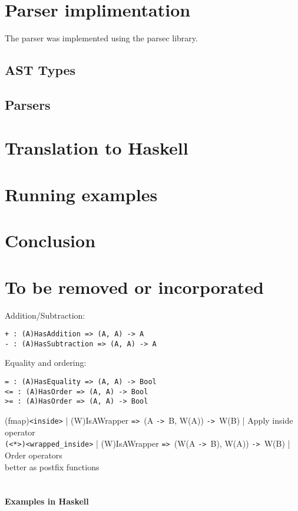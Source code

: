 \documentclass{article}
\def\H{Haskell}
\def\ra{\texttt{->}\ }
\def\Ra{\texttt{=>}\ }
\begin{document}
\section{Parser implimentation}

The parser was implemented using the parsec library.

\subsection{AST Types}

\subsection{Parsers}

\section{Translation to \H}
\section{Running examples}
\section{Conclusion}

\section{To be removed or incorporated}

Addition/Subtraction:
\begin{verbatim}
+ : (A)HasAddition => (A, A) -> A
- : (A)HasSubtraction => (A, A) -> A
\end{verbatim}
Equality and ordering:
\begin{verbatim}
= : (A)HasEquality => (A, A) -> Bool
<= : (A)HasOrder => (A, A) -> Bool
>= : (A)HasOrder => (A, A) -> Bool
\end{verbatim}

(fmap)\texttt{<inside>} | (W)IsAWrapper \Ra (A \ra B, W(A)) \ra W(B) | Apply inside operator \\
\texttt{(<*>)<wrapped_inside>} | (W)IsAWrapper \Ra (W(A \ra B), W(A)) \ra W(B) | Order operators \\

better as postfix functions \\
\hspace{1cm}\\
\paragraph{Examples in \H}
\end{document}
